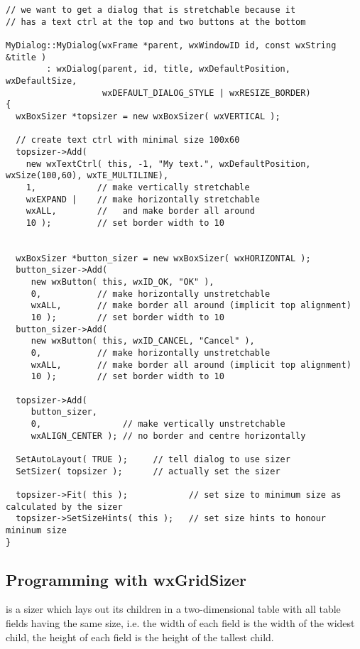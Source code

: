 \begin{verbatim}
// we want to get a dialog that is stretchable because it
// has a text ctrl at the top and two buttons at the bottom

MyDialog::MyDialog(wxFrame *parent, wxWindowID id, const wxString &title )
        : wxDialog(parent, id, title, wxDefaultPosition, wxDefaultSize,
                   wxDEFAULT_DIALOG_STYLE | wxRESIZE_BORDER)
{
  wxBoxSizer *topsizer = new wxBoxSizer( wxVERTICAL );

  // create text ctrl with minimal size 100x60
  topsizer->Add(
    new wxTextCtrl( this, -1, "My text.", wxDefaultPosition, wxSize(100,60), wxTE_MULTILINE),
    1,            // make vertically stretchable
    wxEXPAND |    // make horizontally stretchable
    wxALL,        //   and make border all around
    10 );         // set border width to 10


  wxBoxSizer *button_sizer = new wxBoxSizer( wxHORIZONTAL );
  button_sizer->Add(
     new wxButton( this, wxID_OK, "OK" ),
     0,           // make horizontally unstretchable
     wxALL,       // make border all around (implicit top alignment)
     10 );        // set border width to 10
  button_sizer->Add(
     new wxButton( this, wxID_CANCEL, "Cancel" ),
     0,           // make horizontally unstretchable
     wxALL,       // make border all around (implicit top alignment)
     10 );        // set border width to 10

  topsizer->Add(
     button_sizer,
     0,                // make vertically unstretchable
     wxALIGN_CENTER ); // no border and centre horizontally

  SetAutoLayout( TRUE );     // tell dialog to use sizer
  SetSizer( topsizer );      // actually set the sizer

  topsizer->Fit( this );            // set size to minimum size as calculated by the sizer
  topsizer->SetSizeHints( this );   // set size hints to honour mininum size
}
\end{verbatim}

\subsection{Programming with wxGridSizer}\label{gridsizerprogramming}

 is a sizer which lays out its children in a two-dimensional
table with all table fields having the same size,
i.e. the width of each field is the width of the widest child,
the height of each field is the height of the tallest child.

